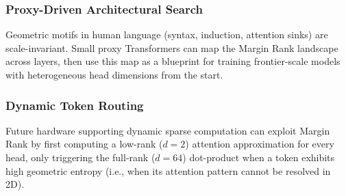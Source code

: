 \subsubsection{Proxy-Driven Architectural Search}
Geometric motifs in human language (syntax, induction, attention sinks) are scale-invariant.
Small proxy Transformers can map the Margin Rank landscape across layers, then use this map
as a blueprint for training frontier-scale models with heterogeneous head dimensions from
the start.

\subsubsection{Dynamic Token Routing}
Future hardware supporting dynamic sparse computation can exploit Margin Rank by first
computing a low-rank ($d=2$) attention approximation for every head, only triggering the
full-rank ($d=64$) dot-product when a token exhibits high geometric entropy (i.e., when its
attention pattern cannot be resolved in 2D).
